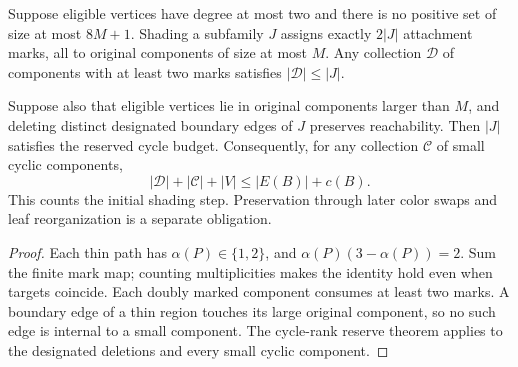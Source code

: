 \begin{theorem}
  \label{thm:lowerbounds-algebraic-thin-path-marks}
  \leanok
  Suppose eligible vertices have degree at most two and there is no
  positive set of size at most $8M+1$. Shading a subfamily $J$ assigns
  exactly $2|J|$ attachment marks, all to original components of size
  at most $M$. Any collection $\mathcal D$ of components with at least
  two marks satisfies $|\mathcal D|\le |J|$.

  Suppose also that eligible vertices lie in original components larger
  than $M$, and deleting distinct designated boundary edges of $J$
  preserves reachability. Then $|J|$ satisfies the reserved cycle budget.
  Consequently, for any collection $\mathcal C$ of small cyclic components,
  \[
    |\mathcal D|+|\mathcal C|+|V|\le |E(B)|+c(B).
  \]
  This counts the initial shading step. Preservation through later color
  swaps and leaf reorganization is a separate obligation.
\end{theorem}
\begin{proof}
  \leanok
  Each thin path has $\alpha(P)\in\{1,2\}$, and
  $\alpha(P)(3-\alpha(P))=2$. Sum the finite mark map; counting
  multiplicities makes the identity hold even when targets coincide.
  Each doubly marked component consumes at least two marks. A boundary
  edge of a thin region touches its large original component, so no such
  edge is internal to a small component. The cycle-rank reserve theorem
  applies to the designated deletions and every small cyclic component.
\end{proof}

